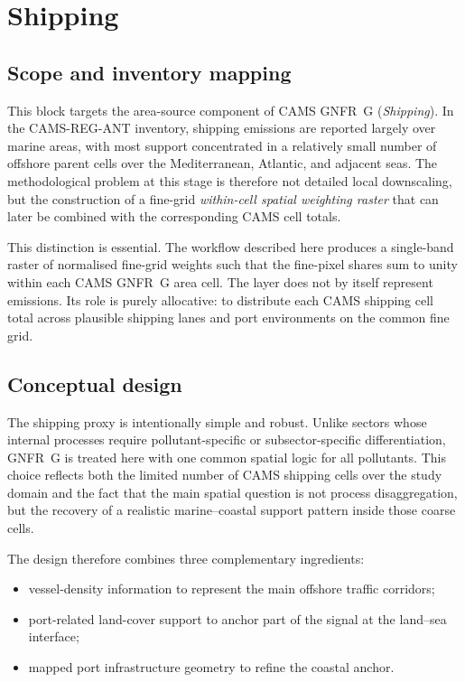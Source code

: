 \section{Shipping}
\label{sec:shipping}

\subsection{Scope and inventory mapping}

This block targets the area-source component of CAMS GNFR~G
(\emph{Shipping}). In the CAMS-REG-ANT inventory, shipping emissions are
reported largely over marine areas, with most support concentrated in a
relatively small number of offshore parent cells over the Mediterranean,
Atlantic, and adjacent seas. The methodological problem at this stage is
therefore not detailed local downscaling, but the construction of a
fine-grid \emph{within-cell spatial weighting raster} that can later be
combined with the corresponding CAMS cell totals.

This distinction is essential. The workflow described here produces a
single-band raster of normalised fine-grid weights such that the
fine-pixel shares sum to unity within each CAMS GNFR~G area cell. The
layer does not by itself represent emissions. Its role is purely
allocative: to distribute each CAMS shipping cell total across plausible
shipping lanes and port environments on the common fine grid.

\subsection{Conceptual design}

The shipping proxy is intentionally simple and robust. Unlike sectors
whose internal processes require pollutant-specific or subsector-specific
differentiation, GNFR~G is treated here with one common spatial logic for
all pollutants. This choice reflects both the limited number of CAMS
shipping cells over the study domain and the fact that the main spatial
question is not process disaggregation, but the recovery of a realistic
marine--coastal support pattern inside those coarse cells.

The design therefore combines three complementary ingredients:
\begin{itemize}
  \item vessel-density information to represent the main offshore traffic
        corridors;
  \item port-related land-cover support to anchor part of the signal at
        the land--sea interface;
  \item mapped port infrastructure geometry to refine the coastal anchor.
\end{itemize}

